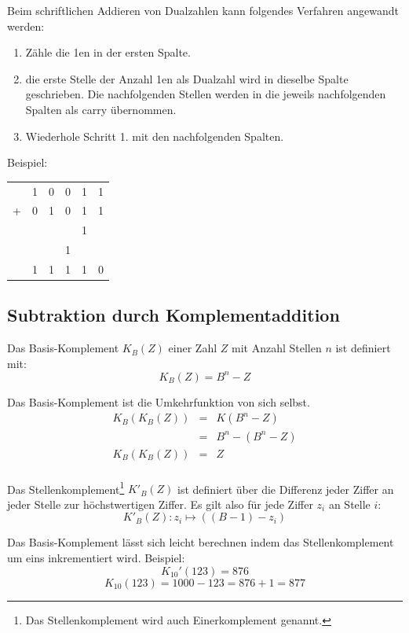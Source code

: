 \documentclass[11pt,a4paper]{scrreprt}
\begin{document}
Beim schriftlichen Addieren von Dualzahlen kann folgendes Verfahren angewandt werden:
\begin{enumerate}
\item
	Zähle die 1en in der ersten Spalte.
\item
	die erste Stelle der Anzahl 1en als Dualzahl wird in dieselbe Spalte geschrieben. Die nachfolgenden Stellen werden in die jeweils nachfolgenden Spalten als carry übernommen.
\item
	Wiederhole Schritt 1. mit den nachfolgenden Spalten.
\end{enumerate}

Beispiel:

\begin{tabular}{lrrrrr}
  & 1 & 0 & 0 & 1 & 1 \\
+ & 0 & 1 & 0 & 1 & 1 \\
\hline
  &   &   &   & 1 &   \\
  &   &   & 1 &   &   \\
\hline
  & 1 & 1 & 1 & 1 & 0
\end{tabular}

\subsection{Subtraktion durch Komplementaddition}
Das Basis-Komplement $K_B(Z)$ einer Zahl $Z$ mit Anzahl Stellen $n$ ist definiert mit:
$$ K_B(Z) = B^n - Z$$

Das Basis-Komplement ist die Umkehrfunktion von sich selbst.
\begin{eqnarray*}
K_B(K_B(Z)) &=& K(B^n - Z) \\
&=& B^n - (B^n - Z) \\
K_B(K_B(Z)) &=& Z \\
\end{eqnarray*}

Das Stellenkomplement\footnote{Das Stellenkomplement wird auch Einerkomplement genannt.} $K'_B(Z)$ ist definiert über die Differenz jeder Ziffer an jeder Stelle zur höchstwertigen Ziffer. Es gilt also für jede Ziffer $z_i$ an Stelle $i$:
$$ K'_B(Z): z_i \mapsto ((B - 1) - z_i) $$

Das Basis-Komplement lässt sich leicht berechnen indem das Stellenkomplement um eins inkrementiert wird. Beispiel:
$$ K_{10}'(123) = 876 $$
$$ K_{10}(123) = 1000 - 123 = 876 + 1 = 877 $$
\end{document}
